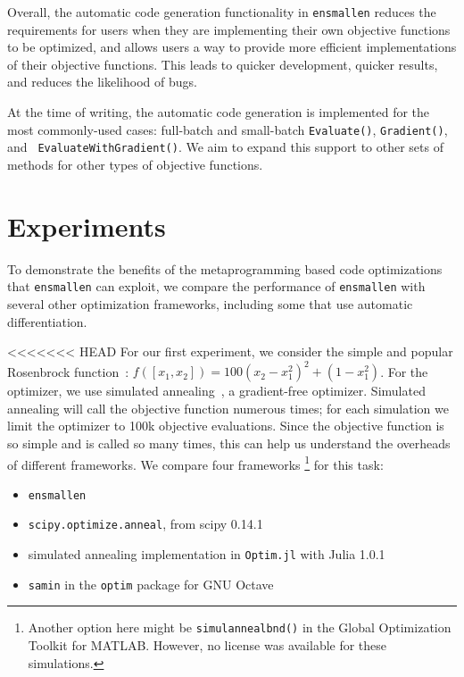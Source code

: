 \documentclass{article}
\begin{document}
Overall, the automatic code generation functionality in {\tt ensmallen}
reduces the requirements for users
when they are implementing their own objective functions to be optimized,
and allows users a way to provide more efficient implementations of their
objective functions.
This leads to quicker development, quicker results, and reduces the likelihood of bugs.

At the time of writing, the automatic code generation
is implemented for the most commonly-used cases:
full-batch and small-batch {\tt Evaluate()}, {\tt Gradient()}, and {\tt
EvaluateWithGradient()}.  We aim to expand this support to other
sets of methods for other types of objective functions.


\vspace*{-0.3em}
\section{Experiments}
\vspace*{-0.5em}

To demonstrate the benefits of the metaprogramming based code optimizations
that {\tt ensmallen} can exploit,
we compare the performance of {\tt ensmallen} with several other
optimization frameworks, including some that use automatic differentiation.

<<<<<<< HEAD
For our first experiment, we consider the simple and popular Rosenbrock
function~\cite{Rosenbrock1960}: $f([x_1, x_2]) = 100 (x_2 - x_1^2)^2 + (1 -
x_1^2)$.  For the optimizer, we use simulated
annealing~\cite{kirkpatrick1983optimization}, a gradient-free optimizer.
Simulated annealing will call the objective function numerous times; for each
simulation we limit the optimizer to 100k objective evaluations.  Since the
objective function is so simple and is called so many times, this can help us
understand the overheads of different frameworks.  We compare four frameworks%
%
\footnote{Another option here might be {\tt simulannealbnd()} 
in the Global Optimization Toolkit for MATLAB.
However, no license was available for these simulations.}
%
for this task:

\vspace*{-0.3em}
\begin{itemize} \itemsep -1pt
  \item {\tt ensmallen}
  \item {\tt scipy.optimize.anneal}, from scipy 0.14.1~\cite{jones2014scipy}
  \item simulated annealing implementation in {\tt Optim.jl} with Julia
1.0.1~\cite{mogensen2018optim}
  \item {\tt samin} in the {\tt optim} package for GNU Octave~\cite{octave}
\end{itemize}
\vspace*{-0.3em}
\end{document}
